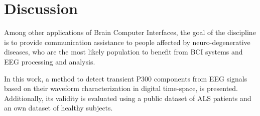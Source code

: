 \documentclass[utf8]{frontiersSCNS} %
\begin{document}

\section{Discussion}
\label{discussion}





Among other applications of Brain Computer Interfaces, the goal of the discipline is to provide communication assistance to people affected by neuro-degenerative diseases, who are the most likely population to benefit from BCI systems and EEG processing and analysis.

In this work, a method to detect transient P300 components from EEG signals based on their waveform characterization in digital time-space, is presented.  Additionally, its validity is evaluated using a public dataset of ALS patients and an own dataset of healthy subjects. 
\end{document}
